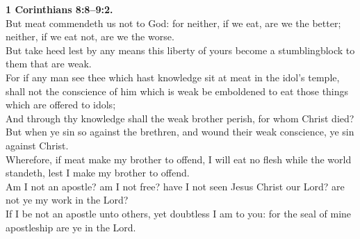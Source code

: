 \documentclass[10pt]{article} %
\begin{document}
{\begin{minipage}[t]{0.45\textwidth}
\textbf{1 Corinthians 8:8--9:2.}\\
But meat commendeth us not to God: for neither, if we eat, are we the better; neither, if we eat not, are we the worse.\\
But take heed lest by any means this liberty of yours become a stumblingblock to them that are weak.\\
For if any man see thee which hast knowledge sit at meat in the idol's temple, shall not the conscience of him which is weak be emboldened to eat those things which are offered to idols;\\
And through thy knowledge shall the weak brother perish, for whom Christ died?\\
But when ye sin so against the brethren, and wound their weak conscience, ye sin against Christ.\\
Wherefore, if meat make my brother to offend, I will eat no flesh while the world standeth, lest I make my brother to offend.\\
Am I not an apostle? am I not free? have I not seen Jesus Christ our Lord? are not ye my work in the Lord?\\
If I be not an apostle unto others, yet doubtless I am to you: for the seal of mine apostleship are ye in the Lord.\\

\end{minipage}}
\vspace*{\fill}
\newpage
\Huge%
\vspace*{\fill}
\begin{spacing}{1.2}%
\end{spacing}
\vspace*{\fill}
\end{document}
